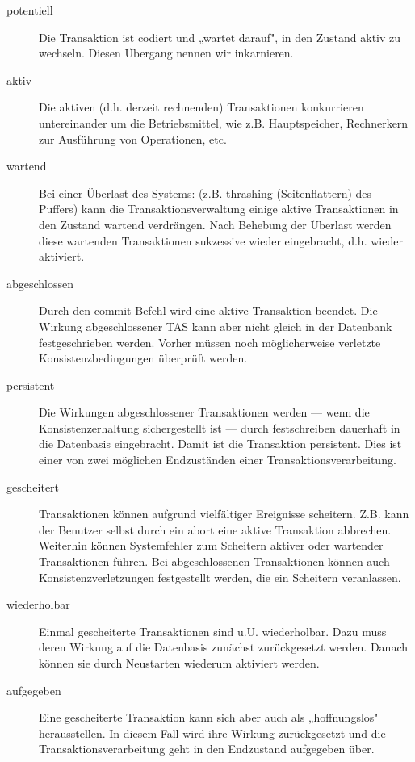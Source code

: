 \documentclass{lehramt-informatik-haupt}
\begin{document}
\begin{description}
\item[potentiell]

Die Transaktion ist codiert und „wartet darauf", in den Zustand aktiv zu
wechseln. Diesen Übergang nennen wir inkarnieren.

\item[aktiv]

Die aktiven (d.h. derzeit rechnenden) Transaktionen konkurrieren
untereinander um die Betriebsmittel, wie z.B. Hauptspeicher, Rechnerkern
zur Ausführung von Operationen, etc.

\item[wartend]

Bei einer Überlast des Systems: (z.B. thrashing (Seitenflattern) des
Puffers) kann die Transaktionsverwaltung einige aktive Transaktionen in
den Zustand wartend verdrängen. Nach Behebung der Überlast werden diese
wartenden Transaktionen sukzessive wieder eingebracht, d.h. wieder
aktiviert.

\item[abgeschlossen]

Durch den commit-Befehl wird eine aktive Transaktion beendet. Die
Wirkung abgeschlossener TAS kann aber nicht gleich in der Datenbank
festgeschrieben werden. Vorher müssen noch möglicherweise verletzte
Konsistenzbedingungen überprüft werden.

\item[persistent]

Die Wirkungen abgeschlossener Transaktionen werden — wenn die
Konsistenzerhaltung sichergestellt ist — durch festschreiben dauerhaft
in die Datenbasis eingebracht. Damit ist die Transaktion persistent.
Dies ist einer von zwei möglichen Endzuständen einer
Transaktionsverarbeitung.

\item[gescheitert]

Transaktionen können aufgrund vielfältiger Ereignisse scheitern. Z.B.
kann der Benutzer selbst durch ein abort eine aktive Transaktion
abbrechen. Weiterhin können Systemfehler zum Scheitern aktiver oder
wartender Transaktionen führen. Bei abgeschlossenen Transaktionen können
auch Konsistenzverletzungen festgestellt werden, die ein Scheitern
veranlassen.

\item[wiederholbar]

Einmal gescheiterte Transaktionen sind u.U. wiederholbar. Dazu muss
deren Wirkung auf die Datenbasis zunächst zurückgesetzt werden. Danach
können sie durch Neustarten wiederum aktiviert werden.

\item[aufgegeben]

Eine gescheiterte Transaktion kann sich aber auch als „hoffnungslos"
herausstellen. In diesem Fall wird ihre Wirkung zurückgesetzt und die
Transaktionsverarbeitung geht in den Endzustand aufgegeben über.
\end{description}
\end{document}
